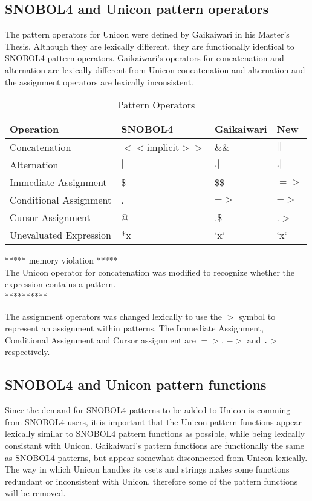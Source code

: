 \documentclass{article}
\begin{document}
\subsection{SNOBOL4 and Unicon pattern operators}
The pattern operators for Unicon were defined by Gaikaiwari in his Master's Thesis.  Although they are lexically different, they are functionally identical to SNOBOL4 pattern operators.  Gaikaiwari's operators for concatenation and alternation are lexically different from Unicon concatenation and alternation and the assignment operators are lexically inconsistent.  

\begin{table}[ht]
	\caption{Pattern Operators}
	\centering
	\begin{tabular}{|l|l|l|l|}
		\hline\hline
		Operation & SNOBOL4 & Gaikaiwari & New\\
		\hline
		Concatenation & $<<$implicit$>>$ & \&\& & $||$ \\
		Alternation & $|$ & $.|$ & $.|$ \\
		\hline
		Immediate Assignment & \$ & \$\$ & $=>$ \\
		Conditional Assignment & . & $->$ & $->$\\
		Cursor Assignment & @ & .\$ & .$>$ \\
		\hline
		Unevaluated Expression & $*$x & `x` & `x` \\
		\hline
	\end{tabular}
\end{table}
***** memory violation *****\\
The Unicon operator for concatenation was modified to recognize whether the expression contains a pattern.\\
**********

The assignment operators was changed lexically to use the \texttt{$>$} symbol to represent an assignment within patterns.  The Immediate Assignment, Conditional Assignment and Cursor assignment are \texttt{$=>$}, \texttt{$->$} and \texttt{.$>$} respectively.

\vspace{1 pc}
\subsection{SNOBOL4 and Unicon pattern functions}
Since the demand for SNOBOL4 patterns to be added to Unicon is comming from SNOBOL4 users, it is important that the Unicon pattern functions appear lexically similar to SNOBOL4 pattern functions as possible, while being lexically consistant with Unicon.  Gaikaiwari's pattern functions 
are functionally the same as SNOBOL4 patterns, but appear somewhat disconnected from Unicon lexically.  The way in which Unicon handles its csets and strings makes some functions redundant or inconsistent with Unicon, therefore some of the pattern functions will be removed. 
\end{document}
